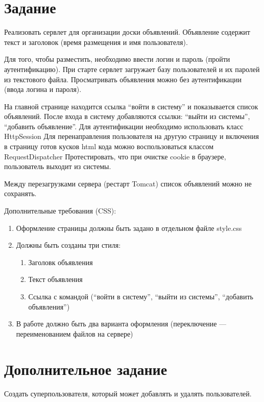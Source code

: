 \documentclass{article}
\begin{document}
    \section{Задание}
    Реализовать сервлет для организации доски объявлений. Объявление содержит текст и заголовок (время размещения и имя пользователя).

    Для того, чтобы разместить, необходимо ввести логин и пароль (пройти аутентификацию). При старте сервлет загружает базу пользователей и их паролей из текстового файла. Просматривать объявления можно без аутентификации (ввода логина и пароля).

    На главной странице находится ссылка “войти в систему” и показывается список объявлений. После входа в систему добавляются ссылки: “выйти из системы”, “добавить объявление”.
    Для аутентификации необходимо использовать класс HttpSession
    Для перенаправления пользователя на другую страницу и включения в  страницу готов кусков html кода можно воспользоваться классом RequestDispatcher
    Протестировать, что при очистке cookie в браузере, пользователь выходит из системы.

    Между перезагрузками сервера (рестарт Tomcat) список объявлений можно не сохранять.

    Дополнительные требования (CSS):


    \begin{enumerate}
        \item Оформление страницы должны быть задано в отдельном файле style.css
        \item Должны быть созданы три стиля:

        \begin{enumerate}
            \item Заголовк объявления
            \item Текст объявления
            \item Ссылка с командой  (“войти в систему”, “выйти из системы”, “добавить объявления”)
        \end{enumerate}
        \item В работе должно быть два варианта оформления (переключение --- переименованием файлов на сервере)
    \end{enumerate}

    \section{Дополнительное задание}
    Создать суперпользователя, который может добавлять и удалять пользователей. 
\end{document}
